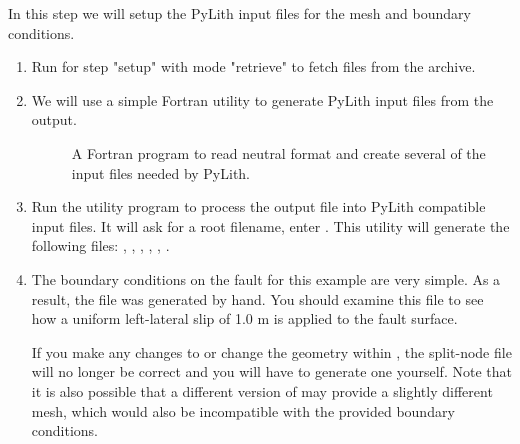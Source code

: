 In this step we will setup the PyLith input files for the mesh and
boundary conditions.

\begin{enumerate}
\item Run  for step "setup" with mode "retrieve" to
  fetch files from the archive.

  \begin{screen}
    \shellprompt{}
  \end{screen}
  
\item We will use a simple Fortran utility to generate PyLith
  input files from the  output.

  \begin{description}
  \item[] A Fortran program to read
     neutral format and create several of the
    input files needed by PyLith.
  \end{description}
  
\item Run the  utility program to process the
   output file into PyLith compatible input files.
  It will ask for a root filename, enter . This
  utility will generate the following files:
  , ,
  , ,
  , .

  \begin{screen}
    \shellprompt{}
  \end{screen}
  
\item The boundary conditions on the fault for this example are
  very simple. As a result, the  file was
  generated by hand. You should examine this file to see how a uniform
  left-lateral slip of 1.0 m is applied to the fault surface.

  \begin{warning}
    If you make any changes to  or change the
    geometry within , the split-node file
     will no longer be correct and you will
    have to generate one yourself.  Note that it is also possible that
    a different version of  may provide a slightly
    different mesh, which would also be incompatible with the provided
    boundary conditions.
  \end{warning}
  

\end{enumerate}
